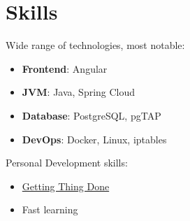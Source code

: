 \section*{Skills}
{ %
  Wide range of technologies, most notable:

  \begin{itemize}
    \item \textbf{Frontend}: Angular
    \item \textbf{JVM}: Java, Spring Cloud
    \item \textbf{Database}: PostgreSQL, pgTAP
    \item \textbf{DevOps}: Docker, Linux, iptables
  \end{itemize}

  Personal Development skills:
  \begin{itemize}
    \item \href{https://gettingthingsdone.com}{Getting Thing Done}
    \item Fast learning
  \end{itemize}
}
